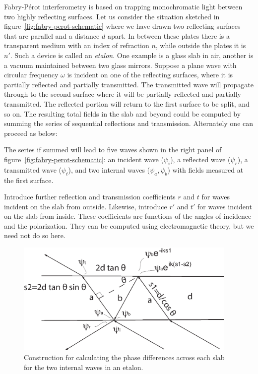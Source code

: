 Fabry-P\'erot interferometry is based on trapping monochromatic light between two
highly reflecting surfaces. Let us consider the situation sketched in figure~\ref{fig:fabry-perot-schematic} where we have drawn two reflecting surfaces that are parallel and a distance $d$ apart. In between these plates there is a transparent medium with an index of refraction $n$, while outside the plates it is $n'$. Such a device is called an {\it etalon}. One example is a glass slab in air, another is a vacuum maintained between two glass mirrors. Suppose a plane wave with circular frequency $\omega$ is incident on one of the reflecting surfaces, where it is partially reflected and partially transmitted. The transmitted wave will propagate through to the second surface where it will be partially reflected and partially transmitted. The reflected portion will return to the first surface to be split, and so on. The resulting total fields in the slab
and beyond could be computed by summing the series of sequential reflections and transmission. Alternately one can proceed as below:

The series if summed will lead to five waves shown in the right panel of figure~\ref{fig:fabry-perot-schematic}: an incident wave ($\psi_i$), a reflected wave
($\psi_r$),  a transmitted wave ($\psi_t$), and two internal waves ($\psi_a,\psi_b$) 
with fields measured at the first surface. 

Introduce further reflection and transmission coefficients $r$ and $t$ for waves incident
on the slab from outside. Likewise, introduce $r'$ and $t'$ for waves incident on the slab
from inside. These coefficients are functions of the angles of incidence and the polarization. They can be computed using electromagnetic theory, but we need not do so here. 

\begin{figure}[h]
  \centering
	\includegraphics[width=0.95\textwidth]{fabry-phase-diff.eps}
  \caption{Construction for calculating the phase differences across each slab for the
two internal waves in an etalon.}
  \label{fig:fabry-phase-diff}
\end{figure}

